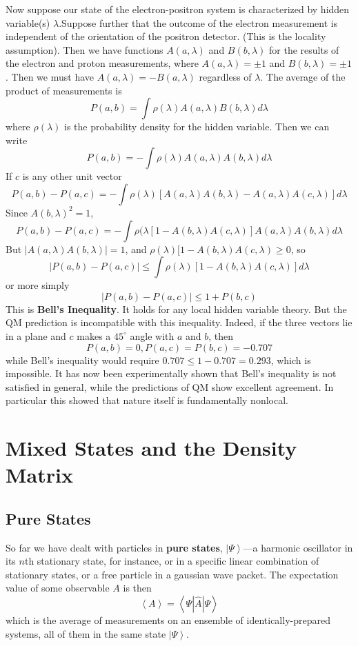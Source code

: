 \documentclass[12pt, a4paper, oneside, openright, titlepage]{book}
\newcommand{\ket}[1]{\left\vert#1\right\rangle}
\newcommand{\brkt}[1]{\left\langle #1\right\rangle}
\begin{document}
Now suppose our state of the electron-positron system is characterized by hidden variable(s) $\lambda$.Suppose further that the outcome of the electron measurement is independent of the orientation of the positron detector. (This is the locality assumption). Then we have functions $A(a,\lambda)$ and $B(b,\lambda)$ for the results of the electron and proton measurements, where $A(a,\lambda) = \pm 1$ and $B(b,\lambda) = \pm 1$. Then we must have $A(a,\lambda) = -B(a,\lambda)$ regardless of $\lambda$. The average of the product of measurements is $$P(a,b) = \int \rho(\lambda)A(a,\lambda)B(b,\lambda)d\lambda$$
where $\rho(\lambda)$ is the probability density for the hidden variable. Then we can write $$P(a,b) = -\int \rho(\lambda)A(a,\lambda)A(b,\lambda)d\lambda$$
If $c$ is any other unit vector $$P(a,b) - P(a,c) = -\int\rho(\lambda)\left[A(a,\lambda)A(b,\lambda)-A(a,\lambda)A(c,\lambda)\right]d\lambda$$
Since $A(b,\lambda)^2 = 1$, $$P(a,b)-P(a,c) = -\int\rho(\lambda[1-A(b,\lambda)A(c,\lambda)]A(a,\lambda)A(b,\lambda)d\lambda$$
But $|A(a,\lambda)A(b,\lambda)| = 1$, and $\rho(\lambda)[1-A(b,\lambda)A(c,\lambda)\geq 0$, so $$|P(a,b)-P(a,c)| \leq \int\rho(\lambda)[1-A(b,\lambda)A(c,\lambda)]d\lambda$$
or more simply $$|P(a,b)-P(a,c)| \leq 1+P(b,c)$$
This is \textbf{Bell's Inequality}. It holds for any local hidden variable theory. But the QM prediction is incompatible with this inequality. Indeed, if the three vectors lie in a plane and $c$ makes a $45^{\circ}$ angle with $a$ and $b$, then $$P(a,b) = 0, P(a,c) = P(b,c) = -0.707$$
while Bell's inequality would require $0.707 \leq 1-0.707 = 0.293$, which is impossible. It has now been experimentally shown that Bell's inequality is not satisfied in general, while the predictions of QM show excellent agreement. In particular this showed that nature itself is fundamentally nonlocal.


\section{Mixed States and the Density Matrix}

\subsection{Pure States}

So far we have dealt with particles in \textbf{pure states}, $\ket{\Psi}$---a harmonic oscillator in its $n$th stationary state, for instance, or in a specific linear combination of stationary states, or a free particle in a gaussian wave packet. The expectation value of some observable $A$ is then $$\brkt{A} = \brkt{\Psi|\hat{A}|\Psi}$$
which is the average of measurements on an ensemble of identically-prepared systems, all of them in the same state $\ket{\Psi}$.
\end{document}

